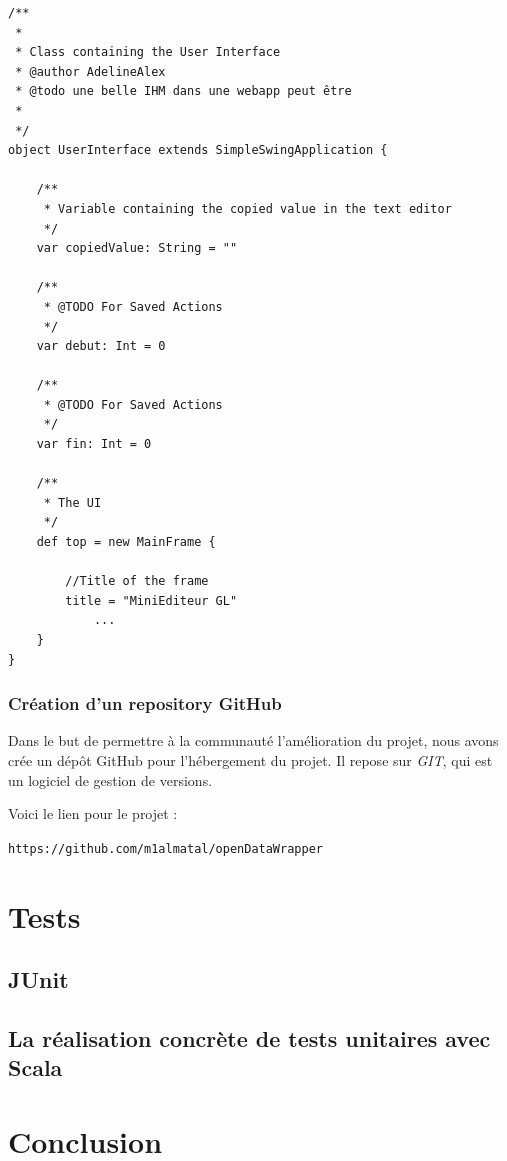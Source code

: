 \documentclass[a4paper,11pt]{article}
\begin{document}
	
\newpage
\begin{lstlisting}[caption=Exemple de scaladoc, label=java]
/**
 *
 * Class containing the User Interface
 * @author AdelineAlex
 * @todo une belle IHM dans une webapp peut être
 *
 */
object UserInterface extends SimpleSwingApplication {

	/**
	 * Variable containing the copied value in the text editor
	 */
	var copiedValue: String = ""
	
	/**
	 * @TODO For Saved Actions
	 */
	var debut: Int = 0

	/**
	 * @TODO For Saved Actions
	 */
	var fin: Int = 0

	/**
	 * The UI
	 */
	def top = new MainFrame {

		//Title of the frame
		title = "MiniEditeur GL"
			...
	}
}

\end{lstlisting}	





\subsubsection{Création d'un repository GitHub}
Dans le but de permettre à la communauté l'amélioration du projet, nous avons crée un dépôt GitHub pour l'hébergement du projet. Il repose sur \textit{GIT}, qui est un logiciel de gestion de versions.

Voici le lien pour le projet :
\begin{center}
\texttt{https://github.com/m1almatal/openDataWrapper}
\end{center}






\section{Tests}

\subsection{JUnit}


\subsection{La réalisation concrète de tests unitaires avec Scala}






\section{Conclusion}


\newpage
\listoffigures  %
\listoftables
\newpage
\nocite{*}
\newpage
\end{document}
